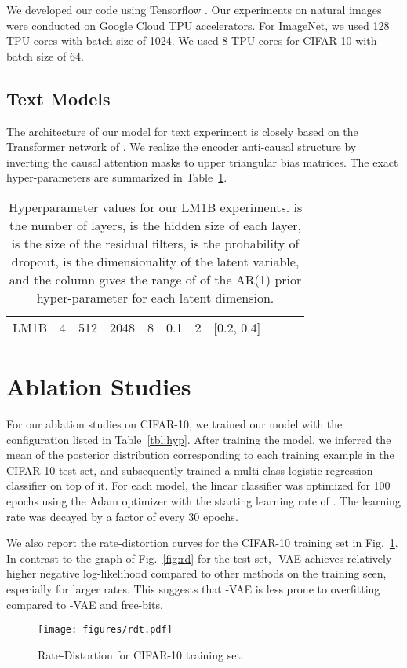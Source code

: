 \documentclass{article} \usepackage{iclr2019_conference,times}
\def\figref#1{figure~\ref{#1}}
\renewcommand{\figref}[1]{Fig.~\ref{#1}}
\newcommand{\tblref}[1]{Table~\ref{#1}}
\begin{document}
We developed our code using Tensorflow \citep{tensorflow}. Our experiments on natural images were conducted on Google Cloud TPU accelerators. For ImageNet, we used 128 TPU cores with batch size of 1024. We used 8 TPU cores for CIFAR-10 with batch size of 64.




\subsection{Text Models}
The architecture of our model for text experiment is closely based on the Transformer network of \cite{Vaswani2017}. We realize the encoder anti-causal structure by inverting the causal attention masks to upper triangular bias matrices. The exact hyper-parameters are summarized in \tblref{tbl:txthyp}.

\begin{table}[ht]
\centering
\begin{tabular}{@{}l|llllllllll@{}}
                    &   &  &  &  &  &  & \\
\toprule
LM1B     & 4 & 512&  2048 & 8 & 0.1 & 2 & [0.2, 0.4] \\
\bottomrule
\end{tabular}
\caption{Hyperparameter values for our LM1B experiments.  is the number of layers,  is the hidden size of each layer,  is the size of the residual filters,  is the probability of dropout,  is the dimensionality of the latent variable, and the  column gives the range of of the AR(1) prior hyper-parameter for each latent dimension.}\label{tbl:txthyp}
\end{table}

\section{Ablation Studies}\label{app:abl}
For our ablation studies on CIFAR-10, we trained our model with the configuration listed in \tblref{tbl:hyp}. After training the model, we inferred the mean of the posterior distribution corresponding to each training example in the CIFAR-10 test set, and subsequently trained a multi-class logistic regression classifier on top of it. For each model, the linear classifier was optimized for 100 epochs using the Adam optimizer with the starting learning rate of . The learning rate was decayed by a factor of  every 30 epochs.

We also report the rate-distortion curves for the CIFAR-10 training set in \figref{fig:rdt}. In contrast to 
the graph of \figref{fig:rd} for the test set, -VAE achieves relatively higher negative log-likelihood compared to other methods on the training seen, especially for larger rates. This suggests that -VAE is less prone to overfitting compared to -VAE and free-bits.
\begin{figure}[h!]
    \centering
    \texttt{[image: figures/rdt.pdf]}
    \caption{Rate-Distortion for CIFAR-10 training set.}        
    \label{fig:rdt}
\end{figure}
\end{document}
